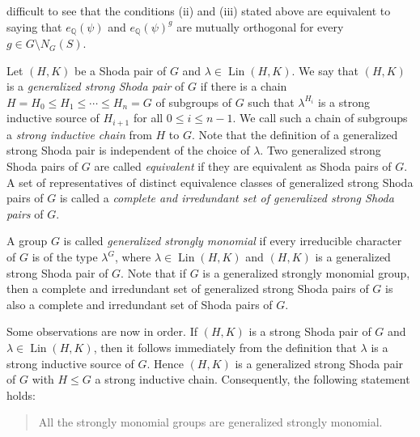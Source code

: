 \documentclass[12pt,a4paper]{article}
\begin{document}
difficult to see that the  conditions (ii) and (iii) stated above are equivalent to saying that $e_{\mathbb{Q}}(\psi)$ and $e_{\mathbb{Q}}(\psi)^{g}$ are mutually orthogonal for every $g \in G\setminus N_{G}(S)$. \par  Let $(H,K)$ be a Shoda pair of $G$ and $\lambda \in \operatorname{Lin}(H,K)$. We say that $(H,K)$ is  a \textit{generalized strong Shoda pair} of $G$ if there is a chain $H=H_{0}\leq H_{1}\leq \cdots \leq H_{n}=G$ of subgroups of $G$ such that  $\lambda^{H_{i}}$ is a strong inductive source of $H_{i+1}$ for all $0\leq i \leq n-1$. We call such a chain of subgroups a \textit{strong inductive chain} from $H$ to $G$. Note that the definition of a generalized strong Shoda pair is independent of the choice of $\lambda$. Two generalized strong Shoda pairs of $G$ are called \textit{equivalent} if they are equivalent as Shoda pairs of $G$. A set of representatives of distinct equivalence classes of generalized strong Shoda pairs of $G$ is called a \textit{complete and irredundant set of generalized strong Shoda pairs} of $G$.\par A group $G$ is called \textit{generalized strongly monomial} if every irreducible character of $G$ is of the type $\lambda^{G}$, where $\lambda \in \operatorname{Lin}(H,K)$ and $(H,K)$ is a generalized strong Shoda pair of $G$. Note that if $G$ is a generalized strongly monomial group, then a complete and irredundant set of generalized strong Shoda pairs of $G$ is also a complete and irredundant set of Shoda pairs of $G$. \par Some observations are now in order. If $(H,K)$ is a strong Shoda pair of $G$ and $\lambda \in \operatorname{Lin}(H,K)$, then it follows immediately from the definition that $\lambda$ is a strong inductive source of $G$. Hence $(H,K)$ is a generalized strong Shoda pair of $G$ with $H\leq G$ a strong inductive chain. Consequently, the following statement holds: \begin{quote} All the strongly monomial groups are generalized strongly monomial.
\end{quote}
$$
\end{document}
